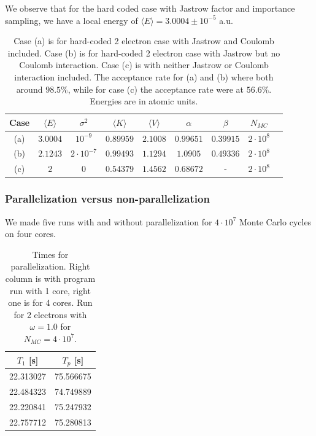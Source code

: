 \documentclass[11pt]{article}
\begin{document}
We observe that for the hard coded case with Jastrow factor and importance sampling, we have a local energy of $\langle E\rangle = 3.0004\pm 10^{-5}$ a.u.

\begin{table}[H]
	\centering
	\caption{Case (a) is for hard-coded 2 electron case with Jastrow and Coulomb included. Case (b) is for hard-coded 2 electron case with Jastrow but no Coulomb interaction. Case (c) is with neither Jastrow or Coulomb interaction included. The acceptance rate for (a) and (b) where both around $98.5\%$, while for case (c) the acceptance rate were at $56.6\%$. Energies are in atomic units.}
	\begin{tabular}{c c c c c c c c c}
		\\ \hline \hline
		Case &$\langle E \rangle$ &     $\sigma^2$ &$\langle K\rangle$ &$\langle V \rangle$ &       $\alpha$ &        $\beta$ &       $N_{MC}$ \\ \hline
		(a) &$ 3.0004$ &$        10^{-9}$ &$        0.89959$ &$         2.1008$ &$        0.99651$ &$        0.39915$ &$          2\cdot10^8$ \\ 
		(b) &$ 2.1243$ &$  2\cdot10^{-7}$ &$        0.99493$ &$         1.1294$ &$         1.0905$ &$        0.49336$ &$          2\cdot10^8$ \\ 
		(c) &$      2$ &$              0$ &$        0.54379$ &$         1.4562$ &$        0.68672$ &  -               &$          2\cdot10^8$ \\ 
		\hline \hline
	\end{tabular}
	\label{tab:hc2}
\end{table}

\subsubsection{Parallelization versus non-parallelization}
We made five runs with and without parallelization for $4\cdot 10^7$ Monte Carlo cycles on four cores.

\begin{table}[H]
	\centering
	\caption{Times for parallelization. Right column is with program run with 1 core, right one is for 4 cores. Run for 2 electrons with $\omega = 1.0$ for $N_{MC}=4\cdot10^7$.}
	\begin{tabular}{c c}
		\\ \hline \hline
		$T_1$ [s]& $T_p$ [s] \\ \hline
		22.313027 & 75.566675 \\
		22.484323 & 74.749889 \\
		22.220841 & 75.247932 \\
		22.757712 & 75.280813 \\
        \hline \hline
	\end{tabular}
	\label{tab:parallelization-times}
\end{table}
\end{document}
